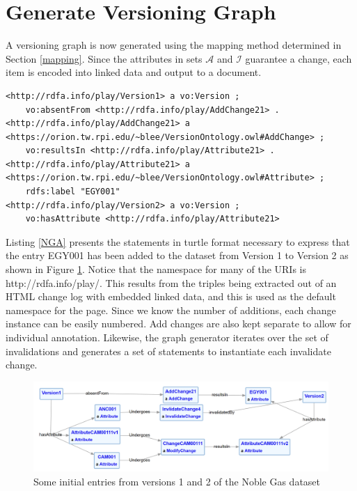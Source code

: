 \section{Generate Versioning Graph}

A versioning graph is now generated using the mapping method determined in Section \ref{mapping}.
Since the attributes in sets \(\mathcal{A}\) and \(\mathcal{I}\) guarantee a change, each item is encoded into linked data and output to a document.

\begin{lstlisting}[language=SPARQL, caption=Noble Gas Add in Turtle, label=NGA]
<http://rdfa.info/play/Version1> a vo:Version ;
	vo:absentFrom <http://rdfa.info/play/AddChange21> .
<http://rdfa.info/play/AddChange21> a <https://orion.tw.rpi.edu/~blee/VersionOntology.owl#AddChange> ;
	vo:resultsIn <http://rdfa.info/play/Attribute21> .
<http://rdfa.info/play/Attribute21> a <https://orion.tw.rpi.edu/~blee/VersionOntology.owl#Attribute> ;
	rdfs:label "EGY001"
<http://rdfa.info/play/Version2> a vo:Version ;
	vo:hasAttribute <http://rdfa.info/play/Attribute21>
\end{lstlisting}
Listing \ref{NGA} presents the statements in turtle format necessary to express that the entry EGY001 has been added to the dataset from Version 1 to Version 2 as shown in Figure \ref{NobleGraph1}.
Notice that the namespace for many of the URIs is \textlangle http://rdfa.info/play/\textrangle.
This results from the triples being extracted out of an HTML change log with embedded linked data, and this is used as the default namespace for the page.
Since we know the number of additions, each change instance can be easily numbered.
Add changes are also kept separate to allow for individual annotation.
Likewise, the graph generator iterates over the set of invalidations and generates a set of statements to instantiate each invalidate change.

\begin{figure}
	\centering
	\includegraphics[scale=0.30]{figures/NobleVersion.png}
	\caption{Some initial entries from versions 1 and 2 of the Noble Gas dataset}
	\label{NobleGraph1}
\end{figure}

